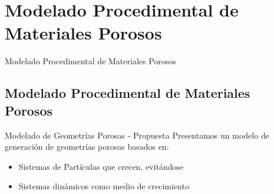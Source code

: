 \documentclass[spanish]{beamer}
\begin{document}
\section[Mod. de Materiales Porosos]{Modelado Procedimental de Materiales Porosos}

\begin{frame}
\begin{block}{}
\begin{center}
\vspace{1cm}
\huge{Modelado Procedimental de Materiales Porosos}
\vspace{1cm}
\end{center}
\end{block}
\end{frame}

\subsection{Modelado Procedimental de Materiales Porosos}
\begin{frame}{Modelado de Geometrías Porosas - Propuesta}
Presentamos un modelo de generación de geometrías porosas basados en:
\begin{itemize}
\item Sistemas de Partículas que crecen, evitándose
\item Sistemas dinámicos como medio de crecimiento
\end{itemize}
\end{frame}
\end{document}
